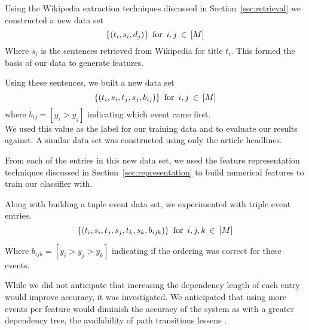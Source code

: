 \documentclass[bsc,frontabs,twoside,singlespacing,parskip,deptreport]{infthesis}     %
\begin{document}
    Using the Wikipedia extraction techniques discussed in Section~\ref{sec:retrieval} we constructed a new data set
    \begin{equation}
      \{(t_{i},s_{i},d_{j})\} \hspace{0.5em} \text{for} \hspace{0.5em}i,j  \hspace{0.2em}\in \hspace{0.2em}[M]\nonumber
    \end{equation}
    Where $s_i$ is the sentences retrieved from Wikipedia for title $t_i$. 
    This formed the basis of our data to generate features.

    Using these sentences, we built a new data set
    \begin{equation}
      \{(t_{i},s_{i},t_{j},s_{j},b_{ij})\} \hspace{0.5em} \text{for} \hspace{0.5em} i,j \hspace{0.2em}\in \hspace{0.2em}[M]\nonumber
    \end{equation}
    where $b_{ij} = [y_{i} > y_{j}]$ indicating which event came first.\\
    We used this value as the label for our training data and to evaluate our results against.
    A similar data set was constructed using only the article headlines.
    
    From each of the entries in this new data set, we used the feature representation techniques discussed in Section~\ref{sec:representation} to build numerical
    features to train our classifier with.

Along with building a tuple event data set, we experimented with triple event entries.
\begin{equation}
      \{(t_{i},s_{i},t_{j},s_{j},t_{k},s_{k},b_{ijk})\} \hspace{0.5em} \text{for} \hspace{0.5em} i,j,k \hspace{0.2em}\in \hspace{0.2em}[M]\nonumber
\end{equation}

Where $b_{ijk} = [y_i > y_j > y_k]$ indicating if the ordering was correct for these events.

While we did not anticipate that increasing the dependency length of each entry would improve accuracy, it was investigated.
We anticipated that using more events per feature would diminish the accuracy of the system as
with a greater dependency tree, the availability of path transitions lessens \cite{gerdes2013computational}.
\end{document}
